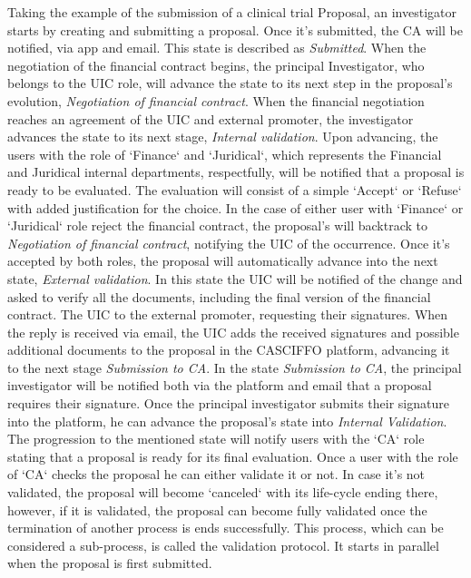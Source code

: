 Taking the example of the submission of a clinical trial Proposal, an investigator starts by creating and submitting a proposal. Once it's submitted, the CA will be notified, via app and email. This state is described as \textit{Submitted}.  
When the negotiation of the financial contract begins, the principal Investigator, who belongs to the UIC role, will advance the state to its next step in the proposal's evolution, \textit{Negotiation of financial contract}.
When the financial negotiation reaches an agreement of the UIC and external promoter, the investigator advances the state to its next stage, \textit{Internal validation}. Upon advancing, the users with the role of `Finance` and `Juridical`, which represents the Financial and Juridical internal departments, respectfully, will be notified that a proposal is ready to be evaluated. The evaluation will consist of a simple `Accept` or `Refuse` with added justification for the choice. In the case of either user with `Finance` or `Juridical` role reject the financial contract, the proposal's will backtrack to \textit{Negotiation of financial contract}, notifying the UIC of the occurrence.  
Once it's accepted by both roles, the proposal will automatically advance into the next state, \textit{External validation}. In this state the UIC will be notified of the change and asked to verify all the documents, including the final version of the financial contract. The UIC to the external promoter, requesting their signatures. When the reply is received via email, the UIC adds the received signatures and possible additional documents to the proposal in the CASCIFFO platform, advancing it to the next stage \textit{Submission to CA}.  
In the state \textit{Submission to CA}, the principal investigator will be notified both via the platform and email that a proposal requires their signature. Once the principal investigator submits their signature into the platform, he can advance the proposal's state into \textit{Internal Validation}. The progression to the mentioned state will notify users with the `CA` role stating that a proposal is ready for its final evaluation.  
Once a user with the role of `CA` checks the proposal he can either validate it or not. In case it's not validated, the proposal will become `canceled` with its life-cycle ending there, however, if it is validated, the proposal can become fully validated once the termination of another process is ends successfully.  
This process, which can be considered a sub-process, is called the validation protocol. It starts in parallel when the proposal is first submitted.  
